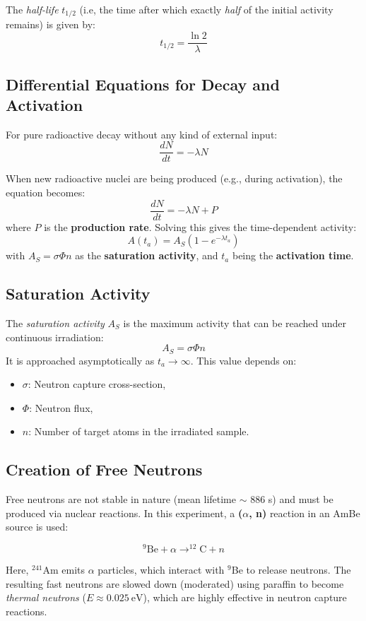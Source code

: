 \documentclass[12pt,a4paper]{article}
\begin{document}
The \textit{half-life} $t_{1/2}$ (i.e, the time after which exactly \textit{half} of the initial activity remains) is given by:
\[
t_{1/2} = \frac{\ln 2}{\lambda}
\]

\subsection{Differential Equations for Decay and Activation}

For pure radioactive decay without any kind of external input:
\[
\frac{dN}{dt} = -\lambda N
\]

When new radioactive nuclei are being produced (e.g., during activation), the equation becomes:
\[
\frac{dN}{dt} = -\lambda N + P
\]
where $P$ is the \textbf{production rate}. Solving this gives the time-dependent activity:
\[
A(t_a) = A_S \left(1 - e^{-\lambda t_a}\right)
\]
with $A_S = \sigma \Phi n$ as the \textbf{saturation activity}, and $t_a$ being the \textbf{activation time}.

\subsection{Saturation Activity}

The \textit{saturation activity} $A_S$ is the maximum activity that can be reached under continuous irradiation:
\[
A_S = \sigma \Phi n
\]
It is approached asymptotically as $t_a \rightarrow \infty$. This value depends on:
\begin{itemize}
  \item $\sigma$: Neutron capture cross-section,
  \item $\Phi$: Neutron flux,
  \item $n$: Number of target atoms in the irradiated sample.
\end{itemize}

\subsection{Creation of Free Neutrons}

Free neutrons are not stable in nature (mean lifetime $\sim$ 886 s) and must be produced via nuclear reactions. In this experiment, a \textbf{($\alpha$, n)} reaction in an AmBe source is used:

\[
^9\mathrm{Be} + \alpha \rightarrow ^{12}\mathrm{C} + n
\]

Here, $^{241}$Am emits $\alpha$ particles, which interact with $^9$Be to release neutrons. The resulting fast neutrons are slowed down (moderated) using paraffin to become \textit{thermal neutrons} ($E \approx 0.025~\mathrm{eV}$), which are highly effective in neutron capture reactions.
\end{document}

